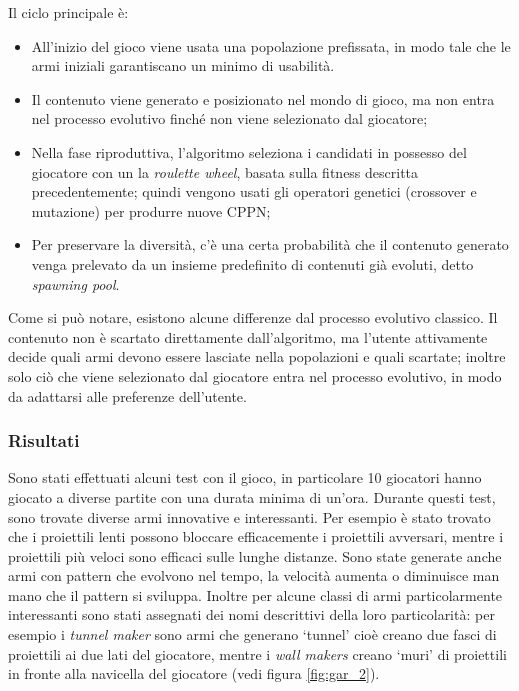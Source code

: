 \documentclass[12pt, italian]{toptesi}
\begin{document}
Il ciclo principale è:

\begin{itemize}
\item All'inizio del gioco viene usata una popolazione prefissata, in modo tale che le armi iniziali garantiscano un minimo di usabilità. 
\item Il contenuto viene generato e posizionato nel mondo di gioco, ma non entra nel processo evolutivo finché non viene selezionato dal giocatore;
\item Nella fase riproduttiva, l'algoritmo seleziona i candidati in possesso del giocatore con un la \emph{roulette wheel}, basata sulla fitness descritta precedentemente; quindi vengono usati gli operatori genetici (crossover e mutazione) per produrre nuove CPPN;
\item Per preservare la diversità, c'è una certa probabilità che il contenuto generato venga prelevato da un insieme predefinito di contenuti già evoluti, detto \emph{spawning pool}.
\end{itemize}

Come si può notare, esistono alcune differenze dal processo evolutivo classico.
Il contenuto non è scartato direttamente dall'algoritmo, ma l'utente attivamente decide quali armi devono essere lasciate nella popolazioni e quali scartate; inoltre solo ciò che viene selezionato dal giocatore entra nel processo evolutivo, in modo da adattarsi alle preferenze dell'utente.

\subsubsection{Risultati} 
Sono stati effettuati alcuni test con il gioco, in particolare 10 giocatori hanno giocato a diverse partite con una durata minima di un'ora.
Durante questi test, sono trovate diverse armi innovative e interessanti.
Per esempio è stato trovato che i proiettili lenti possono bloccare efficacemente i proiettili avversari, mentre i proiettili più veloci sono efficaci sulle lunghe distanze.
Sono state generate anche armi con pattern che evolvono nel tempo, la velocità aumenta o diminuisce man mano che il pattern si sviluppa.
Inoltre per alcune classi di armi particolarmente interessanti sono stati assegnati dei nomi descrittivi della loro particolarità: per esempio i \emph{tunnel maker} sono armi che generano `tunnel' cioè creano due fasci di proiettili ai due lati del giocatore, mentre i \emph{wall makers} creano `muri' di proiettili in fronte alla navicella del giocatore (vedi figura \ref{fig:gar_2}).
\end{document}
